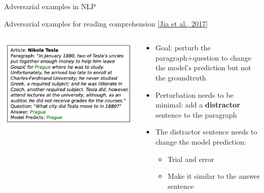 \documentclass[usenames,dvipsnames,notes,11pt,aspectratio=169,hyperref={colorlinks=true, linkcolor=blue}]{beamer}
\begin{document}
\begin{frame}
    {Adversarial examples in NLP}

    Adversarial examples for reading comprehension \href{https://arxiv.org/pdf/1707.07328.pdf}{[Jia et al., 2017]}

    \begin{columns}
        \begin{column}{0.4\textwidth}
            \includegraphics[width=\textwidth]{figures/advqa}
        \end{column}
        \begin{column}{0.6\textwidth}
            \begin{itemize}
                \item Goal: perturb the paragraph+question to change the model's prediction but not the groundtruth 
                \item Perturbation needs to be minimal: add a \textbf{distractor} sentence to the paragraph
                \item The distractor sentence needs to change the model prediction:\pause
                    \begin{itemize}
                        \item Trial and error
                        \item Make it similar to the answer sentence
                    \end{itemize}
            \end{itemize}
        \end{column}
    \end{columns}
\end{frame}
\end{document}
